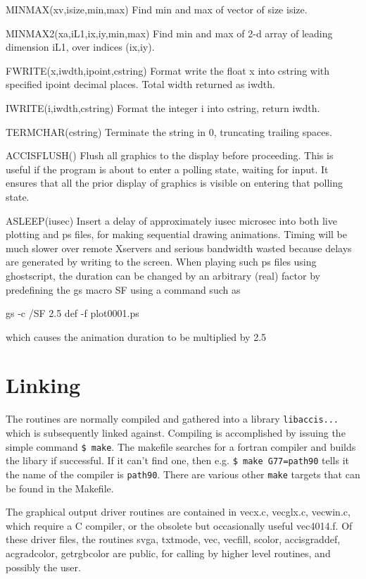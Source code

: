 \documentclass[12pt]{article}
\begin{document}
MINMAX(xv,isize,min,max) Find min and max of vector of size isize.

MINMAX2(xa,iL1,ix,iy,min,max) Find min and max of 2-d array of
leading dimension iL1, over indices (ix,iy).

FWRITE(x,iwdth,ipoint,cstring) Format write the float x into cstring
with specified ipoint decimal places. Total width returned as iwdth.

IWRITE(i,iwdth,cstring) Format the integer i into cstring, return iwdth.

TERMCHAR(cstring) Terminate the string in 0, truncating trailing spaces.

ACCISFLUSH() Flush all graphics to the display before proceeding. This
is useful if the program is about to enter a polling state, waiting
for input. It ensures that all the prior display of graphics is visible on
entering that polling state.

ASLEEP(iusec) Insert a delay of approximately iusec microsec into both
live plotting and ps files, for making sequential drawing animations.
Timing will be much slower over remote Xservers and serious bandwidth
wasted because delays are generated by writing to the screen. When
playing such ps files using ghostscript, the duration can be changed
by an arbitrary (real) factor by predefining the gs macro SF using a
command such as

gs -c /SF 2.5 def -f plot0001.ps

which causes the animation duration to be multiplied by 2.5

\section{Linking}

The routines are normally compiled and gathered into a library
\verb!libaccis...! which is subsequently linked against. Compiling is
accomplished by issuing the simple command \verb!$ make!. The makefile
searches for a fortran compiler and builds the libary if
successful. If it can't find one, then e.g. \verb!$ make G77=path90!
tells it the name of the compiler is \verb!path90!. There are various
other \verb!make! targets that can be found in the Makefile.

The graphical output driver routines are contained in vecx.c,
vecglx.c, vecwin.c, which require a C compiler, or the obsolete but
occasionally useful vec4014.f. Of these driver files, the routines
svga, txtmode, vec, vecfill, scolor, accisgraddef, acgradcolor,
getrgbcolor are public, for calling by higher level routines, and
possibly the user.
\end{document}
